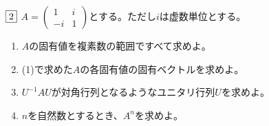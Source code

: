 \documentclass[dvipdfmx]{jsreport}
\begin{document}
\begin{tcolorbox} %
	$\fbox{2}$ $A= \begin{pmatrix}1& i\\ {-i}& 1\end{pmatrix}$とする。ただし$i$は虚数単位とする。
\begin{enumerate}
	\item $A$の固有値を複素数の範囲ですべて求めよ。
	\item (1)で求めた$A$の各固有値の固有ベクトルを求めよ。
	\item $U^{-1}AU$が対角行列となるようなユニタリ行列$U$を求めよ。
	\item $n$を自然数とするとき、$A^n$を求めよ。
\end{enumerate}
\end{tcolorbox}
\end{document}
